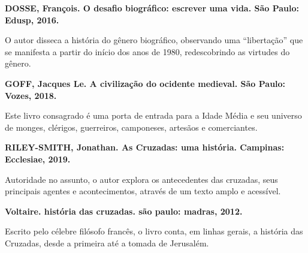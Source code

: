 \documentclass[12pt]{extarticle}
\begin{document}
\textbf{DOSSE, François. O desafio biográfico: escrever uma vida. São
Paulo: Edusp, 2016.}

O autor disseca a história do gênero biográfico, observando uma
``libertação'' que se manifesta a partir do início dos anos de 1980,
redescobrindo as virtudes do gênero.

\textbf{GOFF, Jacques Le. A civilização do ocidente medieval. São Paulo:
Vozes, 2018.}

Este livro consagrado é uma porta de entrada para a Idade Média e seu
universo de monges, clérigos, guerreiros, camponeses, artesãos e
comerciantes.

\textbf{RILEY-SMITH, Jonathan. As Cruzadas: uma história. Campinas:
Ecclesiae, 2019.}

Autoridade no assunto, o autor explora os antecedentes das cruzadas,
seus principais agentes e acontecimentos, através de um texto amplo e
acessível.

\textbf{Voltaire. história das cruzadas. são paulo: madras, 2012.}

Escrito pelo célebre filósofo francês, o livro conta, em linhas gerais,
a história das Cruzadas, desde a primeira até a tomada de Jerusalém.
\end{document}
